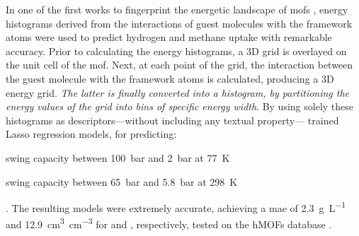 In one of the first works to fingerprint the energetic landscape of \glspl{mof}
\parencite{bucior}, energy histograms derived from the
interactions of guest molecules with the framework atoms were used to predict
hydrogen and methane uptake with remarkable accuracy. Prior to calculating the
energy histograms, a 3D grid is overlayed on the unit cell of
the \gls{mof}. Next, at each point of the grid, the interaction between the
guest molecule with the framework atoms is calculated, producing a 3D energy
grid. \emph{The latter is finally converted into a histogram, by
partitioning the energy values of the grid into bins of specific energy width}.
By using solely these histograms as descriptors---without including any textual
property---\textcite{bucior} trained Lasso regression
models, for predicting:
\begin{enumerate*}[label=\roman*).]
	\item {} swing capacity between \SI{100}{\bar}
		and \SI{2}{\bar} at \SI{77}{\kelvin}
	\item {} swing capacity between \SI{65}{\bar}
		and \SI{5.8}{\bar} at \SI{298}{\kelvin}
\end{enumerate*}.
The resulting models were extremely accurate, achieving a \gls{mae} of \SI{2.3}{\gram\per\liter} and
\SI{12.9}{\cubic\centi\meter\per\cubic\centi\meter} for  and ,
respectively, tested on the hMOFs database
\parencite{siegel36}.

